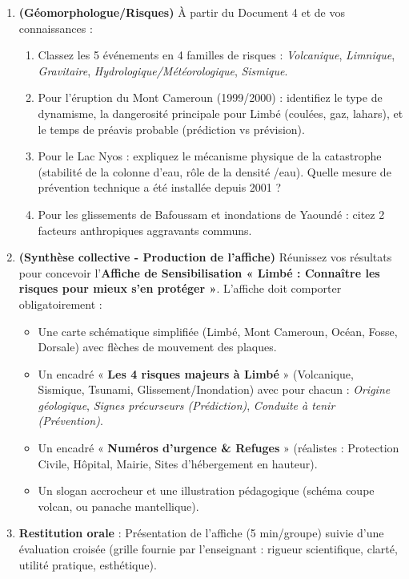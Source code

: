\documentclass[11pt]{article}
\begin{document}
\begin{enumerate}
\begin{enumerate}
    \end{enumerate}
    \item \textbf{(Géomorphologue/Risques)} À partir du Document 4 et de vos connaissances :
    \begin{enumerate}
        \item Classez les 5 événements en 4 familles de risques : \emph{Volcanique}, \emph{Limnique}, \emph{Gravitaire}, \emph{Hydrologique/Météorologique}, \emph{Sismique}.
        \item Pour l'éruption du Mont Cameroun (1999/2000) : identifiez le type de dynamisme, la dangerosité principale pour Limbé (coulées, gaz, lahars), et le temps de préavis probable (prédiction vs prévision).
        \item Pour le Lac Nyos : expliquez le mécanisme physique de la catastrophe (stabilité de la colonne d'eau, rôle de la densité /eau). Quelle mesure de prévention technique a été installée depuis 2001 ?
        \item Pour les glissements de Bafoussam et inondations de Yaoundé : citez 2 facteurs anthropiques aggravants communs.
    \end{enumerate}
    \item \textbf{(Synthèse collective - Production de l'affiche)} Réunissez vos résultats pour concevoir l'\textbf{Affiche de Sensibilisation « Limbé : Connaître les risques pour mieux s'en protéger »}. L'affiche doit comporter obligatoirement :
    \begin{itemize}
        \item Une carte schématique simplifiée (Limbé, Mont Cameroun, Océan, Fosse, Dorsale) avec flèches de mouvement des plaques.
        \item Un encadré « \textbf{Les 4 risques majeurs à Limbé} » (Volcanique, Sismique, Tsunami, Glissement/Inondation) avec pour chacun : \emph{Origine géologique}, \emph{Signes précurseurs (Prédiction)}, \emph{Conduite à tenir (Prévention)}.
        \item Un encadré « \textbf{Numéros d'urgence \& Refuges} » (réalistes : Protection Civile, Hôpital, Mairie, Sites d'hébergement en hauteur).
        \item Un slogan accrocheur et une illustration pédagogique (schéma coupe volcan, ou panache mantellique).
    \end{itemize}
    \item \textbf{Restitution orale} : Présentation de l'affiche (5 min/groupe) suivie d'une évaluation croisée (grille fournie par l'enseignant : rigueur scientifique, clarté, utilité pratique, esthétique).
\end{enumerate}
\end{document}
